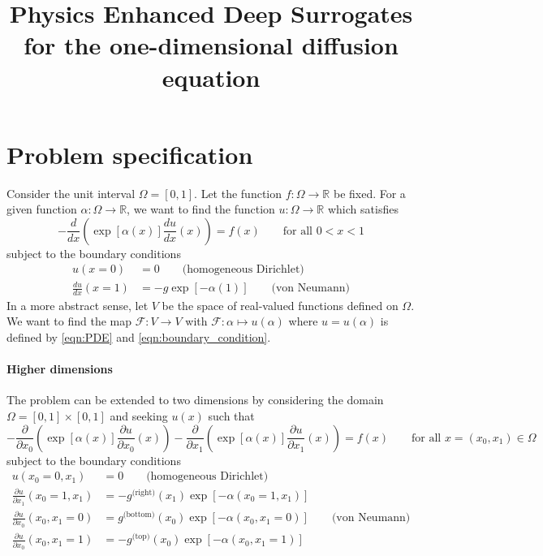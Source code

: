 \documentclass[11pt]{article}
\title{Physics Enhanced Deep Surrogates for the one-dimensional diffusion equation}
\begin{document}
\maketitle
\section{Problem specification}
Consider the unit interval $\Omega=[0,1]$. Let the function $f:\Omega\rightarrow \mathbb{R}$ be fixed. For a given function $\alpha:\Omega\rightarrow \mathbb{R}$, we want to find the function $u:\Omega\rightarrow\mathbb{R}$ which satisfies
\begin{equation}
    -\frac{d}{dx}\left(\exp[\alpha(x)]\frac{du}{dx}(x)\right) = f(x)\qquad\text{for all $0<x<1$}
    \label{eqn:PDE}
\end{equation}
subject to the boundary conditions 
\begin{equation}
    \begin{aligned}
    u(x=0) &=0 \qquad{\text{(homogeneous Dirichlet)}}\\
    \frac{du}{dx}(x=1) &=-g\exp[-\alpha(1)] \qquad{\text{(von Neumann)}}
    \end{aligned}
    \label{eqn:boundary_condition}
\end{equation}
In a more abstract sense, let $V$ be the space of real-valued functions defined on $\Omega$. We want to find the map $\mathcal{F} : V\rightarrow V$ with $\mathcal{F}:\alpha \mapsto u(\alpha)$ where $u=u(\alpha)$ is defined by \eqref{eqn:PDE} and \eqref{eqn:boundary_condition}.
\paragraph{Higher dimensions}
The problem can be extended to two dimensions by considering the domain $\Omega=[0,1]\times[0,1]$ and seeking $u(x)$ such that
\begin{equation}
    -\frac{\partial}{\partial x_0}\left(\exp[\alpha(x)]\frac{\partial u}{\partial x_0}(x)\right)-\frac{\partial}{\partial x_1}\left(\exp[\alpha(x)]\frac{\partial u}{\partial x_1}(x)\right) = f(x)\qquad\text{for all $x=(x_0,x_1)\in \Omega$}
    \label{eqn:PDE_2d}
\end{equation}
subject to the boundary conditions 
\begin{equation}
    \begin{aligned}
    u(x_0=0,x_1) &=0 \qquad{\text{(homogeneous Dirichlet)}}\\
    \frac{\partial u}{\partial x_1}(x_0=1,x_1) &=-g^{\text{(right)}}(x_1)\exp[-\alpha(x_0=1,x_1)]\\
    \frac{\partial u}{\partial x_0}(x_0,x_1=0) &=g^{\text{(bottom)}}(x_0)\exp[-\alpha(x_0,x_1=0)] \qquad{\text{(von Neumann)}}\\
    \frac{\partial u}{\partial x_0}(x_0,x_1=1) &=-g^{\text{(top)}}(x_0)\exp[-\alpha(x_0,x_1=1)]
    \end{aligned}
    \label{eqn:boundary_condition_2d}
\end{equation}
\end{document}
